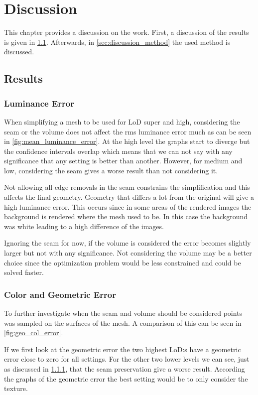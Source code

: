 \chapter{Discussion} \label{cha:discussion}
This chapter provides a discussion on the work. First, a discussion of the results is given in \cref{sec:discussion_results}. Afterwards, in \cref{sec:discussion_method} the used method is discussed.

\section{Results} \label{sec:discussion_results}

\subsection{Luminance Error} \label{sec:discussion_luminance}
When simplifying a mesh to be used for LoD super and high, considering the seam or the volume does not affect the rms luminance error much as can be seen in \cref{fig:mean_luminance_error}. At the high level the graphs start to diverge but the confidence intervals overlap which means that we can not say with any significance that any setting is better than another. However, for medium and low, considering the seam gives a worse result than not considering it.

Not allowing all edge removals in the seam constrains the simplification and this affects the final geometry. Geometry that differs a lot from the original will give a high luminance error. This occurs since in some areas of the rendered images the background is rendered where the mesh used to be. In this case the background was white leading to a high difference of the images.

Ignoring the seam for now, if the volume is considered the error becomes slightly larger but not with any significance. Not considering the volume may be a better choice since the optimization problem would be less constrained and could be solved faster.

\subsection{Color and Geometric Error} \label{sec:discussion_color_geom}
To further investigate when the seam and volume should be considered points was sampled on the surfaces of the mesh. A comparison of this can be seen in \cref{fig:geo_col_error}.

If we first look at the geometric error the two highest LoD:s have a geometric error close to zero for all settings. For the other two lower levels we can see, just as discussed in \cref{sec:discussion_luminance}, that the seam preservation give a worse result. According the graphs of the geometric error the best setting would be to only consider the texture.

